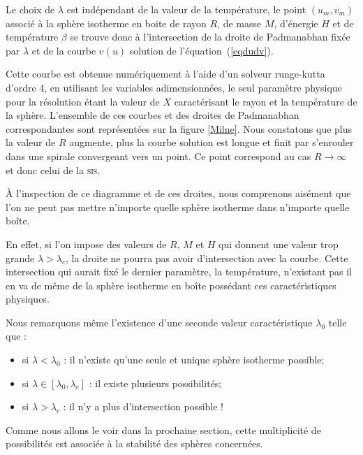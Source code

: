 	Le choix de $\lambda$ est indépendant de la valeur de la température, le point $(u_m,v_m)$ associé à la sphère
	isotherme en boite de rayon $R$, de masse $M$, d'énergie $H$ et de température $\beta$ se trouve donc à
	l'intersection de la droite de Padmanabhan fixée par $\lambda$ et de la courbe $v(u)$ solution de
	l'équation~(\ref{eqdudv}). 
	
	
	Cette courbe est obtenue numériquement à l'aide d'un solveur runge-kutta d'ordre 4, en utilisant les variables adimensionnées, le
	seul paramètre physique pour la résolution étant la valeur de $X$ caractérisant le rayon et la température de la
	sphère.  L'ensemble de ces courbes et des droites de Padmanabhan correspondantes sont représentées sur la figure
	\ref{Milne}.
	Nous constatons que plus la valeur de $R$ augmente, plus la courbe
	solution est longue et finit par s'enrouler dans une spirale convergeant vers un point. Ce point correspond au
	cas $R\to\infty$ et donc celui de la \textsc{sis}.
	
	À l'inspection de ce diagramme et de ces droites, nous comprenons aisément que l'on ne peut pas mettre
	n'importe quelle sphère isotherme dans n'importe quelle boîte. %

	En effet, si l'on impose des valeurs de $R$,
	$M$ et $H$ qui donnent une valeur trop grande $\lambda>\lambda_c$, la droite ne pourra pas avoir d'intersection
	avec la courbe. Cette intersection qui aurait fixé le dernier paramètre, la température, n'existant pas il en va
	de même de la sphère isotherme en boîte possédant ces caractéristiques physiques.
	
	Nous remarquons même l'existence d'une seconde valeur caractéristique $\lambda_0$ telle que :
	\begin{itemize}
		\item si $\lambda < \lambda_0$ : il n'existe qu'une seule et unique sphère isotherme possible;
		\item si $\lambda \in \left[\lambda_0,\lambda_c\right]$ : il existe plusieurs possibilités;
		\item si $\lambda > \lambda_c$ : il n'y a plus d'intersection possible !
	\end{itemize}

Comme nous allons le voir dans la prochaine section, cette multiplicité de possibilités est associée à la stabilité des sphères concernées.

